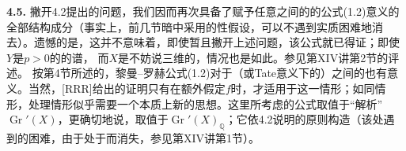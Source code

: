 \textbf{4.5.} 撇开4.2提出的问题，我们因而再次具备了赋予任意之间的的公式(1.2)意义的全部结构成分（事实上，前几节暗中采用的性假设，可以不遇到实质困难地消去）。遗憾的是，这并不意味着，即使暂且撇开上述问题，该公式就已得证；即使$Y$是$p>0$的的谱，
而$X$是不妨说三维的，情况也是如此。参见第XIV讲第2节的评述。
按第4节所述的，黎曼--罗赫公式(1.2)对于（或Tate意义下的）之间的也有意义。当然，[RRR]给出的证明只有在额外假定$f$时，才适用于这一情形；如同情形，处理情形似乎需要一个本质上新的思想。这里所考虑的公式取值于“解析”$\operatorname{Gr}'(X)$，更确切地说，取值于$\operatorname{Gr}'(X)_{\mathbb Q}$；它依4.2说明的原则构造（该处遇到的困难，由于处于而消失，参见第XIV讲第1节）。

